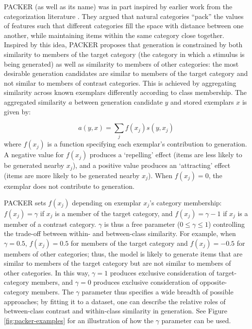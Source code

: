 \documentclass[12pt]{article}
\begin{document}
\begin{flushleft}
PACKER (as well as its name) was in part inspired by earlier work from the categorization literature \citep{hidaka2011packing}. They argued that natural categories ``pack'' the values of features such that different categories fill the space with distance between one another, while maintaining items within the same category close together. Inspired by this idea, PACKER proposes that generation is constrained by both similarity to members of the target category (the category in which a stimulus is being generated) as well as similarity to members of other categories: the most desirable generation candidates are similar to members of the target category and not similar to members of contrast categories. This is achieved by aggregating similarity across known exemplars differently according to class membership. The aggregated similarity $a$ between generation candidate $y$ and stored exemplars $x$ is given by:

\begin{equation}
a(y, x) = \sum_j{f(x_j) s(y, x_j)}
\end{equation}
% 
where $f(x_j)$ is a function specifying each exemplar's contribution to generation. A negative value for $f(x_j)$ produces a `repelling' effect (items are less likely to be generated nearby $x_j$), and a positive value produces an `attracting' effect (items are more likely to be generated nearby $x_j$). When $f(x_j)=0$, the exemplar does not contribute to generation. 

PACKER sets $f(x_j)$ depending on exemplar $x_j$'s category membership: $f(x_j) = \gamma$ if $x_j$ is a member of the target category, and $f(x_j) = \gamma - 1$ if $x_j$ is a member of a contrast category. $\gamma$ is thus a free parameter ($0 \leq \gamma \leq 1$) controlling the trade-off between within- and between-class similarity. For example, when $\gamma = 0.5$, $f(x_j) = 0.5$ for members of the target category and $f(x_j) = -0.5$ for members of other categories; thus, the model is likely to generate items that are similar to members of the target category but are not similar to members of other categories. In this way, $\gamma = 1$ produces exclusive consideration of target-category members, and $\gamma = 0$ produces exclusive consideration of opposite-category members. The $\gamma$ parameter thus specifies a wide breadth of possible approaches; by fitting it to a dataset, one can describe the relative roles of between-class contrast and within-class similarity in generation. See Figure \ref{fig:packer-examples} for an illustration of how the $\gamma$ parameter can be used.


\end{flushleft}
\end{document}
